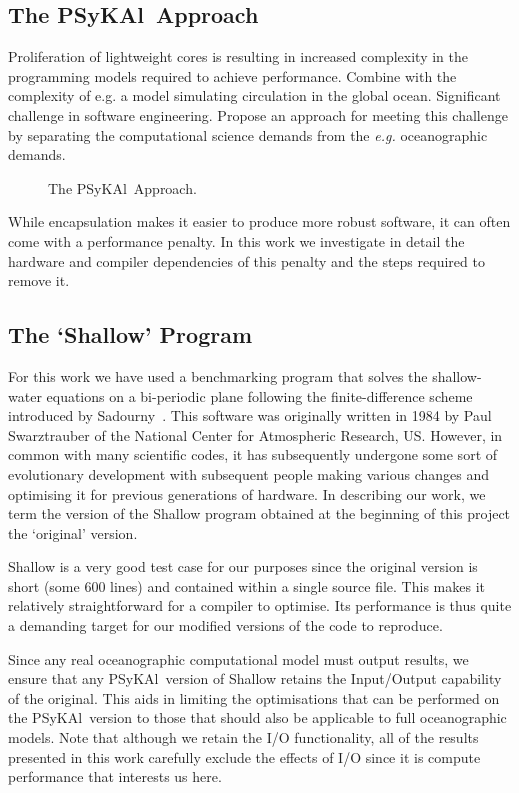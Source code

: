 \documentclass[journal]{IEEEtran}
\newcommand{\psykal}{{PS}y{KA}l\ }
\begin{document}

\subsection{The \psykal Approach}
Proliferation of lightweight cores is resulting in increased
complexity in the programming models required to achieve performance.
Combine with the complexity of e.g. a model simulating circulation in
the global ocean. Significant challenge in software engineering.
Propose an approach for meeting this challenge by separating the
computational science demands from the {\it e.g.} oceanographic
demands.

\begin{figure}
\centering
\caption{The \psykal Approach.}
\end{figure}

While encapsulation makes it easier to produce more robust software,
it can often come with a performance penalty. In this work we
investigate in detail the hardware and compiler dependencies of this
penalty and the steps required to remove it.

\subsection{The `Shallow' Program}
For this work we have used a benchmarking program that solves the
shallow-water equations on a bi-periodic plane following the
finite-difference scheme introduced by Sadourny~\cite{sadourny75}.
This software was originally written in 1984 by Paul Swarztrauber of
the National Center for Atmospheric Research, US.  However, in common
with many scientific codes, it has subsequently undergone some sort of
evolutionary development with subsequent people making various changes
and optimising it for previous generations of hardware.  In describing
our work, we term the version of the Shallow program obtained at the
beginning of this project the `original' version.

Shallow is a very good test case for our purposes since the original
version is short (some 600 lines) and contained within a single source
file. This makes it relatively straightforward for a compiler to
optimise. Its performance is thus quite a demanding target for our
modified versions of the code to reproduce.

Since any real oceanographic computational model must output results,
we ensure that any \psykal version of Shallow retains the Input/Output
capability of the original. This aids in limiting the optimisations
that can be performed on the \psykal version to those that should also
be applicable to full oceanographic models. Note that although we
retain the I/O functionality, all of the results presented in this work
carefully exclude the effects of I/O since it is compute performance
that interests us here.
\end{document}
